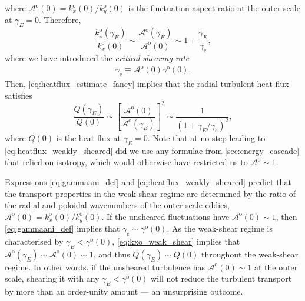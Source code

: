 \documentclass{jpp}
\newcommand{\kxo}{k_x^\text{o}}
\newcommand{\kxoO}{k_{x}^\text{o}(0)}
\newcommand{\kyoO}{k_{y}^\text{o}(0)}
\newcommand{\gammaoO}{\gamma^\text{o}(0)}
\newcommand{\gammaani}{\gamma_{\text{c}}}
\newcommand{\gammaE}{\gamma_{E}}
\newcommand{\A}{\mathcal{A}}
\newcommand{\Ao}{\A^\text{o}}
\newcommand{\AoO}{\A^\text{o}(0)}
\begin{document}
where \(\AoO=\kxoO/\kyoO\) is the fluctuation aspect ratio at the outer scale at \(\gammaE = 0\). Therefore,
\begin{equation}
	\frac{\kxo(\gammaE)}{\kxoO}\sim \frac{\Ao(\gammaE)}{\AoO} \sim 1 + \frac{\gammaE}{\gammaani},
	\label{eq:kxo_weak_shear}
\end{equation}
where we have introduced the \textit{critical shearing rate}
\begin{align}
	\gammaani \equiv \AoO \gammaoO.
	\label{eq:gammaani_def}
\end{align}
Then, \cref{eq:heatflux_estimate_fancy} implies that the radial turbulent heat flux satisfies
\begin{equation}
	\frac{Q(\gammaE)}{Q(0)}\sim \left[\frac{\AoO}{\Ao(\gammaE)}\right]^2  \sim \frac{1}{(1+\gammaE/\gammaani)^2},
	\label{eq:heatflux_weakly_sheared}
\end{equation}
where \(Q(0)\) is the heat flux at \(\gammaE = 0\). Note that at no step leading to \cref{eq:heatflux_weakly_sheared} did we use any formulae from \cref{sec:energy_cascade} that relied on isotropy, which would otherwise have restricted us to \mbox{\(\Ao \sim 1\)}.

Expressions \cref{eq:gammaani_def} and \cref{eq:heatflux_weakly_sheared} predict that the transport properties in the weak-shear regime are determined by the ratio of the radial and poloidal wavenumbers of the outer-scale eddies, \(\AoO = \kxoO/\kyoO\). If the unsheared fluctuations have \(\AoO \sim 1\), then \cref{eq:gammaani_def} implies that \mbox{\(\gammaani \sim \gammaoO\)}. As the weak-shear regime is characterised by \mbox{\(\gammaE < \gammaoO\)}, \cref{eq:kxo_weak_shear} implies that \mbox{\(\Ao(\gammaE) \sim \AoO \sim 1\)}, and thus \(Q(\gammaE) \sim Q(0)\) throughout the weak-shear regime. In other words, if the unsheared turbulence has \(\AoO \sim 1\) at the outer scale, shearing it with any \(\gammaE < \gammaoO\) will not reduce the turbulent transport by more than an order-unity amount --- an unsurprising outcome.
\end{document}

